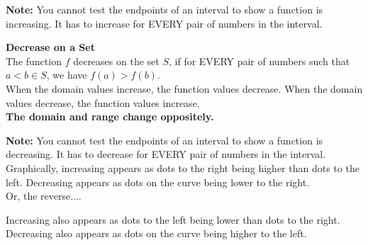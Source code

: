\documentclass{ximera}
\begin{document}
\textbf{Note:} You cannot test the endpoints of an interval to show a function is increasing.  It has to increase for EVERY pair of numbers in the interval.








\begin{definition} \textbf{\textcolor{green!50!black}{Decrease on a Set}} \\

The function $f$ decreases on the set $S$, if for EVERY pair of numbers such that $a < b \in S$, we have  $f(a) > f(b)$. \\

When the domain values increase, the function values decrease. When the domain values decrease, the function values increase.  \\



\textbf{\textcolor{purple!85!blue}{The domain and range change oppositely.}}



\end{definition}






\textbf{Note:} You cannot test the endpoints of an interval to show a function is decreasing.  It has to decrease for EVERY pair of numbers in the interval. \\


Graphically, increasing appears as dots to the right being higher than dots to the left.  Decreasing appears as dots on the curve being lower to the right. \\


Or, the reverse....


Increasing also appears as dots to the left being lower than dots to the right.  \\

Decreasing also appears as dots on the curve being higher to the left. \\
\end{document}
